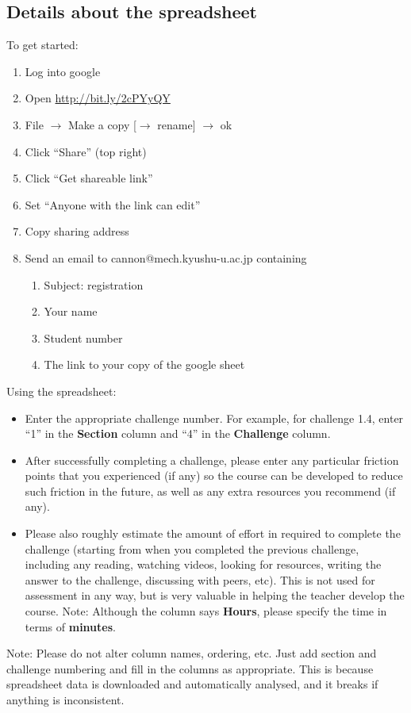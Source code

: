 \subsection{Details about the spreadsheet}
To get started:
\begin{enumerate}
    \item Log into google
    \item Open \url{http://bit.ly/2cPYyQY}
    \item File $\rightarrow$ Make a copy [$\rightarrow$ rename] $\rightarrow$ ok
    \item Click ``Share'' (top right)
    \item Click ``Get shareable link''
    \item Set ``Anyone with the link can edit''
    \item Copy sharing address
    \item Send an email to cannon@mech.kyushu-u.ac.jp containing
    \begin{enumerate}
       \item Subject: \course registration
       \item Your name
       \item Student number
       \item The link to your copy of the google sheet
    \end{enumerate}
\end{enumerate}

Using the spreadsheet:

\begin{itemize}
    \item Enter the appropriate challenge number. For example, for challenge 1.4, enter ``1'' in the \textbf{Section} column and ``4'' in the \textbf{Challenge} column.
    \item After successfully completing a challenge, please enter any particular friction points that you experienced (if any) so the course can be developed to reduce such friction in the future, as well as any extra resources you recommend (if any).
    \item Please also roughly estimate the amount of effort in required to complete the challenge (starting from when you completed the previous challenge, including any reading, watching videos, looking for resources, writing the answer to the challenge, discussing with peers, etc). This is not used for assessment in any way, but is very valuable in helping the teacher develop the course. Note: Although the column says \textbf{Hours}, please specify the time in terms of \textbf{minutes}.
\end{itemize}

Note: Please do not alter column names, ordering, etc. Just add section and challenge numbering and fill in the columns as appropriate. This is because spreadsheet data is downloaded and automatically analysed, and it breaks if anything is inconsistent.
